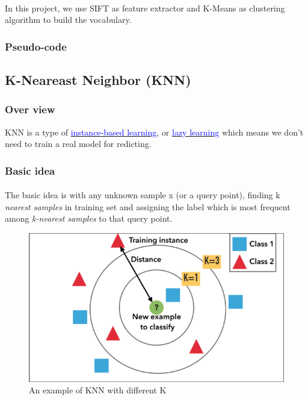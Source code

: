 \paragraph*{}
In this project, we use SIFT as feature extractor and K-Means as clustering algorithm to build the vocabulary.

\subsubsection*{Pseudo-code} 




\subsection{K-Neareast Neighbor (KNN)}
\subsubsection*{Over view}
KNN is a type of \href{https://en.wikipedia.org/wiki/Instance-based_learning}{\textcolor{blue}{instance-based learning}}, or \href{https://en.wikipedia.org/wiki/Lazy_learning}{\textcolor{blue}{lazy learning}} which means we don't need to train a real model for redicting. 

\subsubsection*{Basic idea}
\paragraph*{}
The basic idea is with any unknown sample x (or a query point), finding k \textit{nearest samples} in training set and assigning the label which is most frequent among \textit{k-nearest samples} to that query point.

\begin{figure}[h!]
	\centering
	\includegraphics[width=0.8\linewidth]{images/knn/example.png}
	\caption[KNN example]{An example of KNN with different K}
\end{figure}

